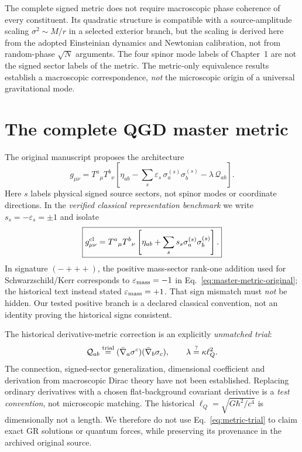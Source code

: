 \documentclass[11pt,a4paper]{article}
\begin{document}
The complete signed metric does not require macroscopic phase coherence of every constituent. Its quadratic structure is compatible with a source-amplitude scaling $\sigma^2\sim M/r$ in a selected exterior branch, but the scaling is derived here from the adopted Einsteinian dynamics and Newtonian calibration, not from random-phase $\sqrt N$ arguments. The four spinor mode labels of Chapter~1 are not the signed sector labels of the metric. The metric-only equivalence results establish a macroscopic correspondence, \emph{not} the microscopic origin of a universal gravitational mode.

\section{The complete QGD master metric}\label{sec:master}
The original manuscript proposes the architecture
\begin{equation}\label{eq:master-metric-original}
\boxed{g_{\mu\nu}=T^a{}_{\mu}T^b{}_{\nu}
\left[\eta_{ab}-\sum_{s}\varepsilon_s\,
\sigma_a^{(s)}\sigma_b^{(s)}
-\lambda\,\mathcal Q_{ab}\right].}
\end{equation}
Here $s$ labels physical signed source sectors, not spinor modes or coordinate directions. In the \emph{verified classical representation benchmark} we write $s_s=-\varepsilon_s=\pm1$ and isolate
\begin{equation}\label{eq:master-classical}
\boxed{g^{\rm cl}_{\mu\nu}=
T^a{}_{\mu}T^b{}_{\nu}
\left[\eta_{ab}+\sum_s s_s\sigma_a^{(s)}\sigma_b^{(s)}\right].}
\end{equation}
In signature $(-+++)$, the positive mass-sector rank-one addition used for Schwarzschild/Kerr corresponds to $\varepsilon_{\rm mass}=-1$ in Eq.~\eqref{eq:master-metric-original}; the historical text instead stated $\varepsilon_{\rm mass}=+1$. That sign mismatch must \emph{not} be hidden. Our tested positive branch is a declared classical convention, not an identity proving the historical signs consistent.

The historical derivative-metric correction is an explicitly \emph{unmatched trial}:
\begin{equation}\label{eq:metric-trial}
\mathcal Q_{ab}\overset{\rm trial}{=}
(\bar\nabla_a\sigma^c)(\bar\nabla_b\sigma_c),
\qquad \lambda\overset{?}{=}\kappa\ell_Q^2.
\end{equation}
The connection, signed-sector generalization, dimensional coefficient and derivation from macroscopic Dirac theory have not been established. Replacing ordinary derivatives with a chosen flat-background covariant derivative is a \emph{test convention}, not microscopic matching. The historical $\ell_Q=\sqrt{G\hbar^2/c^4}$ is dimensionally not a length. We therefore do not use Eq.~\eqref{eq:metric-trial} to claim exact GR solutions or quantum forces, while preserving its provenance in the archived original source.
\end{document}

